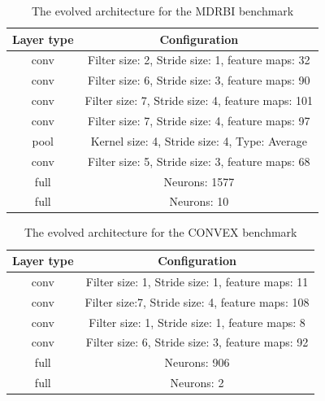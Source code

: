 \documentclass[conference]{IEEEtran}
\begin{document}
\begin{table}[!t]
	\renewcommand{\arraystretch}{1.3}
	\caption{The evolved architecture for the MDRBI benchmark}
	\label{table:EvolvedMDRBICNN}
	\centering
	\begin{tabular}{|c|c|}
		\hline
		Layer type & Configuration\\
		\hline
		conv & Filter size: 2, Stride size: 1, feature maps: 32\\
		\hline
		conv & Filter size: 6, Stride size: 3, feature maps: 90\\
		\hline
		conv & Filter size: 7, Stride size: 4, feature maps: 101\\
		\hline
		conv & Filter size: 7, Stride size: 4, feature maps: 97\\
		\hline
		pool & Kernel size: 4, Stride size: 4, Type: Average\\
		\hline
		conv & Filter size: 5, Stride size: 3, feature maps: 68\\
		\hline
		full & Neurons: 1577\\
		\hline
		full & Neurons: 10\\
		\hline
	\end{tabular}
\end{table}

\begin{table}[!t]
	\renewcommand{\arraystretch}{1.3}
	\caption{The evolved architecture for the CONVEX benchmark}
	\label{table:EvolvedConvexCNN}
	\centering
	\begin{tabular}{|c|c|}
		\hline
		Layer type & Configuration\\
		\hline
		conv & Filter size: 1, Stride size: 1, feature maps: 11\\
		\hline
		conv & Filter size:7, Stride size: 4, feature maps: 108\\
		\hline
		conv & Filter size: 1, Stride size: 1, feature maps: 8\\
		\hline
		conv & Filter size: 6, Stride size: 3, feature maps: 92\\
		\hline
		full & Neurons: 906\\
		\hline
		full & Neurons: 2\\
		\hline
	\end{tabular}
\end{table}
\end{document}
